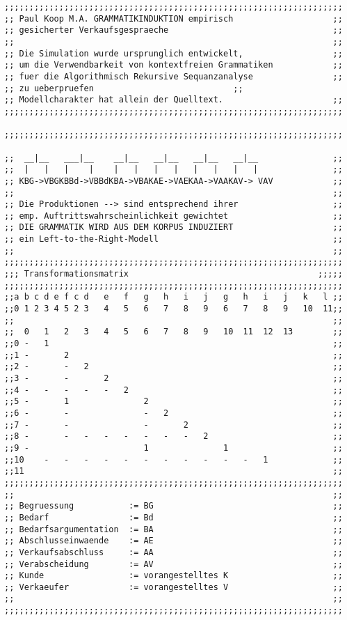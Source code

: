 \documentclass[12pt]{article}
\begin{document}
\begin{verbatim}
;;;;;;;;;;;;;;;;;;;;;;;;;;;;;;;;;;;;;;;;;;;;;;;;;;;;;;;;;;;;;;;;;;;;
;; Paul Koop M.A. GRAMMATIKINDUKTION empirisch                    ;;
;; gesicherter Verkaufsgespraeche                                 ;;
;;                                                                ;;
;; Die Simulation wurde ursprunglich entwickelt,                  ;;
;; um die Verwendbarkeit von kontextfreien Grammatiken            ;;
;; fuer die Algorithmisch Rekursive Sequanzanalyse                ;;
;; zu ueberpruefen					          ;;
;; Modellcharakter hat allein der Quelltext.                      ;;
;;;;;;;;;;;;;;;;;;;;;;;;;;;;;;;;;;;;;;;;;;;;;;;;;;;;;;;;;;;;;;;;;;;;

;;;;;;;;;;;;;;;;;;;;;;;;;;;;;;;;;;;;;;;;;;;;;;;;;;;;;;;;;;;;;;;;;;;;

;;  __|__   ___|__    __|__   __|__   __|__   __|__               ;;
;;  |   |   |    |    |   |   |   |   |   |   |   |               ;;
;; KBG->VBGKBBd->VBBdKBA->VBAKAE->VAEKAA->VAAKAV-> VAV            ;;
;;                                                                ;;
;; Die Produktionen --> sind entsprechend ihrer                   ;;
;; emp. Auftrittswahrscheinlichkeit gewichtet                     ;;
;; DIE GRAMMATIK WIRD AUS DEM KORPUS INDUZIERT                    ;;
;; ein Left-to-the-Right-Modell                                   ;;                                                               
;;                                                                ;;
;;;;;;;;;;;;;;;;;;;;;;;;;;;;;;;;;;;;;;;;;;;;;;;;;;;;;;;;;;;;;;;;;;;;
;;; Transformationsmatrix                                      ;;;;;
;;;;;;;;;;;;;;;;;;;;;;;;;;;;;;;;;;;;;;;;;;;;;;;;;;;;;;;;;;;;;;;;;;;;
;;a	b c	d e	f c	d	e	f	g	h	i	j	g	h	i	j	k	l ;;
;;0	1 2	3 4	5 2	3	4	5	6	7	8	9	6	7	8	9	10	11;;
;;                                                                ;;
;;	0	1	2	3	4	5	6	7	8	9	10	11	12	13	      ;;
;;0	-	1														  ;;
;;1	-		2													  ;;
;;2	-		-	2												  ;;
;;3	-		-		2											  ;;
;;4	-	-	-	-	-	2										  ;;
;;5	-		1				2									  ;;
;;6	-		-				-	2								  ;;
;;7	-		-				-		2							  ;;
;;8	-		-	-	-	-	-	-	-	2						  ;;
;;9	-						1				1					  ;;
;;10	-	-	-	-	-	-	-	-	-	-	-	1			  ;;
;;11															  ;;
;;;;;;;;;;;;;;;;;;;;;;;;;;;;;;;;;;;;;;;;;;;;;;;;;;;;;;;;;;;;;;;;;;;;
;;                                                                ;;
;; Begruessung           := BG                                    ;;
;; Bedarf                := Bd                                    ;;
;; Bedarfsargumentation  := BA                                    ;;
;; Abschlusseinwaende    := AE                                    ;;
;; Verkaufsabschluss     := AA                                    ;;
;; Verabscheidung        := AV                                    ;;
;; Kunde                 := vorangestelltes K                     ;;
;; Verkaeufer            := vorangestelltes V                     ;;
;;                                                                ;;
;;;;;;;;;;;;;;;;;;;;;;;;;;;;;;;;;;;;;;;;;;;;;;;;;;;;;;;;;;;;;;;;;;;;


\end{verbatim}
\end{document}
